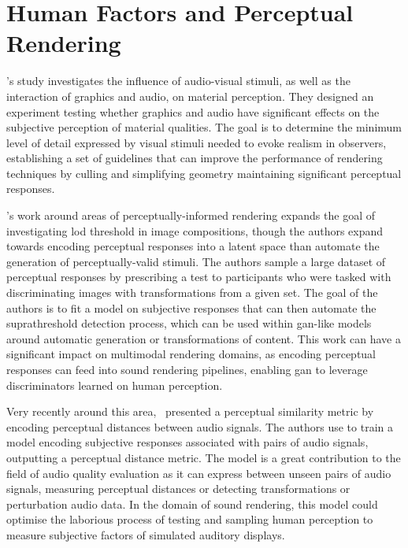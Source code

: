 \section{Human Factors and Perceptual Rendering}\label{sec:perceptual-rendering}
\cite{bonneel2010bimodal}'s study investigates the influence of audio-visual stimuli, as well as the interaction of graphics and audio, on material perception. They designed an experiment testing whether graphics and audio have significant effects on the subjective perception of material qualities. The goal is to determine the minimum level of detail expressed by visual stimuli needed to evoke realism in observers, establishing a set of guidelines that can improve the performance of rendering techniques by culling and simplifying geometry maintaining significant perceptual responses.

\cite{Dolhasz_2020_CVPR}'s work around areas of perceptually-informed rendering expands the goal of investigating \acrshort{lod} threshold in image compositions, though the authors expand towards encoding perceptual responses into a latent space than automate the generation of perceptually-valid stimuli. The authors sample a large dataset of perceptual responses by prescribing a test to participants who were tasked with discriminating images with transformations from a given set. The goal of the authors is to fit a model on subjective responses that can then automate the suprathreshold detection process, which can be used within \acrshort{gan}-like models around automatic generation or transformations of content. This work can have a significant impact on multimodal rendering domains, as encoding perceptual responses can feed into sound rendering pipelines, enabling \acrshort{gan} to leverage discriminators learned on human perception.\par
Very recently around this area,~\cite{manocha2021cdpam} presented a perceptual similarity metric by encoding perceptual distances between audio signals. The authors use  to train a model encoding subjective responses associated with pairs of audio signals, outputting a perceptual distance metric. The model is a great contribution to the field of audio quality evaluation as it can express  between unseen pairs of audio signals, measuring perceptual distances or detecting transformations or perturbation audio data. In the domain of sound rendering, this model could optimise the laborious process of testing and sampling human perception to measure subjective factors of simulated auditory displays.\par

